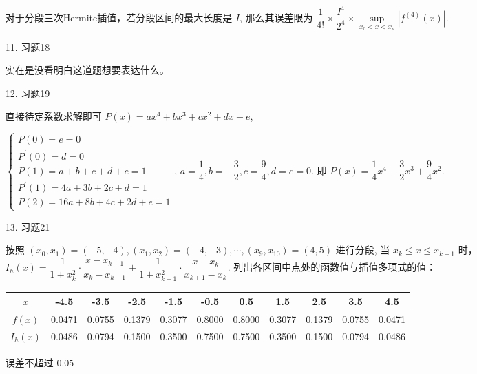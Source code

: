 \documentclass{article}
\begin{document}
\begin{spacing}{1.5}
\begin{itemize}
    对于分段三次Hermite插值，若分段区间的最大长度是 $I$, 那么其误差限为 $\dfrac{1}{4!}\times \dfrac{I^4}{2^4}\times \sup\limits_{x_0<x<x_n} |f^{(4)}(x)|$.

    \item [11.] 习题18
    
    实在是没看明白这道题想要表达什么。

    \item [12.] 习题19
    
    直接待定系数求解即可 $P(x) = ax^4 + bx^3 + cx^2 + dx + e$, 

    $\left\{\begin{array}{l}P(0) = e = 0\\ P^\prime(0) = d = 0\\P(1) = a + b + c + d + e = 1\\ P^\prime(1) = 4a + 3b + 2c + d = 1\\P(2) = 16a + 8b + 4c + 2d + e = 1\end{array}\right.$, $a = \dfrac{1}{4}, b=-\dfrac{3}{2}, c=\dfrac{9}{4}, d=e=0$. 即 $P(x) = \dfrac{1}{4}x^4 - \dfrac{3}{2}x^3 + \dfrac{9}{4}x^2$.

    \item [13.] 习题21 
    
    按照 $(x_0, x_1) = (-5, -4), (x_1, x_2) = (-4, -3), \cdots, (x_9, x_{10}) = (4, 5)$ 进行分段, 当 $x_k\leq x \leq x_{k+1}$ 时，$I_h(x) = \dfrac{1}{1+x_k^2}\cdot\dfrac{x - x_{k+1}}{x_k - x_{k+1}}+\dfrac{1}{1+x_{k+1}^2}\cdot\dfrac{x - x_k}{x_{k+1} - x_k}$. 列出各区间中点处的函数值与插值多项式的值：

    \begin{table}[h]
        \centering
        \begin{tabular}{ccccccccccc}
            \hline 
            $x$ & -4.5 & -3.5 & -2.5 & -1.5 & -0.5 & 0.5 & 1.5 & 2.5 & 3.5 & 4.5 \\
            \hline 
            $f(x)$ & 0.0471 & 0.0755 & 0.1379 & 0.3077 & 0.8000  &      0.8000
            & 0.3077 & 0.1379 & 0.0755 & 0.0471\\
            $I_h(x)$ & 0.0486 & 0.0794 & 0.1500  &     0.3500 &      0.7500 &      0.7500&
            0.3500 &      0.1500  &     0.0794 & 0.0486\\
            \hline
            
        \end{tabular}
    \end{table}

    误差不超过 $0.05$


\end{itemize}
\end{spacing}
\end{document}
